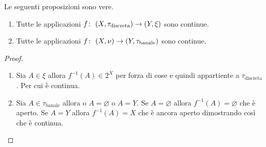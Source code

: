 \begin{theorem}
	Le seguenti proposizioni sono vere.
	\begin{enumerate}
		\item Tutte le applicazioni $f \colon\ (X,\tau_{\text{discreta}}) \rightarrow (Y,\xi)$ sono continue.
		\item Tutte le applicazioni $f \colon\ (X,\nu) \rightarrow (Y,\tau_{\text{banale}})$ sono continue.
	\end{enumerate}
\end{theorem}
\begin{proof}\
	\begin{enumerate}
		\item Sia $A\in \xi$ allora $f^{-1}(A) \in 2^X$ per forza di cose e quindi appartiente a $\tau_{\text{discreta}}$. Per cui è continua.
		\item Sia $A \in \tau_{\text{banale}}$ allora o $A = \varnothing$ o $A = Y$. Se $A = \varnothing$ allora $f^{-1}(A) = \varnothing$ che è aperto. Se $A = Y$ allora $f^{-1}(A) = X$ che è ancora aperto dimostrando così che è continua.
	\end{enumerate}
\end{proof}

